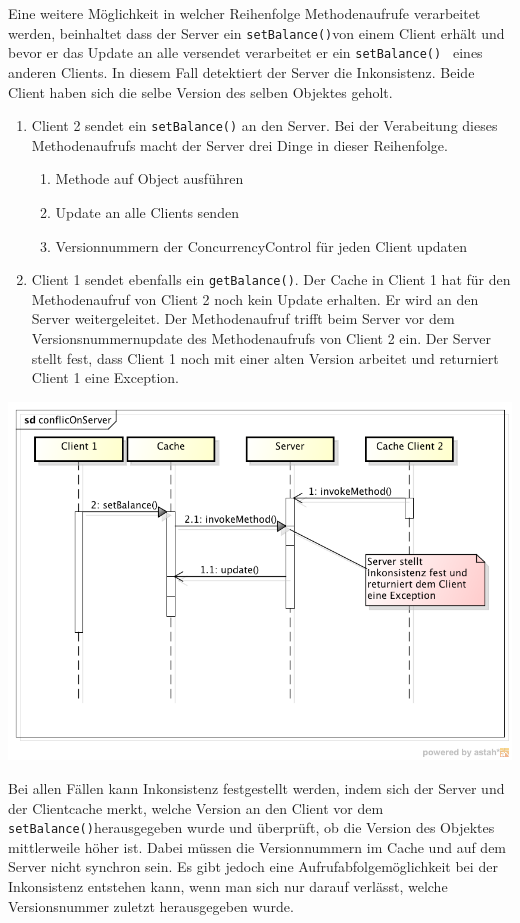 Eine weitere Möglichkeit in welcher Reihenfolge Methodenaufrufe verarbeitet werden, beinhaltet dass der Server ein \verb|setBalance()|von einem Client erhält und bevor er das Update an alle versendet verarbeitet er ein \verb|setBalance() | eines anderen Clients. In diesem Fall detektiert der Server die Inkonsistenz. Beide Client haben sich die selbe Version des selben Objektes geholt.
\begin{enumerate}
\item Client 2 sendet ein \verb|setBalance()| an den Server. Bei der Verabeitung dieses Methodenaufrufs macht der Server drei Dinge in dieser Reihenfolge.
  \begin{enumerate}
  \item Methode auf Object ausführen
  \item Update an alle Clients senden
  \item Versionnummern der ConcurrencyControl für jeden Client updat\-en
\end{enumerate}
\item Client 1 sendet ebenfalls ein \verb|getBalance()|. Der Cache in Client 1 hat für den Methodenaufruf von Client 2 noch kein Update erhalten. Er wird an den Server weitergeleitet. Der Methodenaufruf trifft beim Server vor dem Versionsnummernupdate des Methodenaufrufs von Client 2 ein. Der Server stellt fest, dass Client 1 noch mit einer alten Version arbeitet und returniert Client 1 eine Exception.
\end{enumerate}

\includegraphics[scale=0.3]{images_objectcaching/conflictOnServer}

Bei allen Fällen kann Inkonsistenz festgestellt werden, indem sich der Server und der Clientcache merkt, welche Version an den Client vor dem \verb|setBalance()|herausgegeben wurde und überprüft, ob die Version des Objektes mittlerweile höher ist. Dabei müssen die Versionnummern im Cache und auf dem Server nicht synchron sein. Es gibt jedoch eine Aufrufabfolgemöglichkeit bei der Inkonsistenz entstehen kann, wenn man sich nur darauf verlässt, welche Versionsnummer zuletzt herausgegeben wurde.


